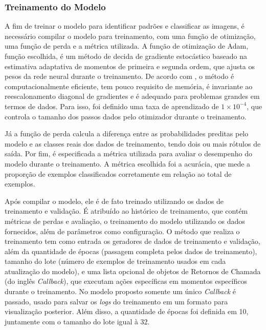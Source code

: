 
\subsubsection{\esp Treinamento do Modelo} \label{treinamento}

A fim de treinar o modelo para identificar padrões e classificar as imagens, é necessário compilar o modelo para treinamento, com uma função de otimização, uma função de perda e a métrica utilizada. A função de otimização de Adam, função escolhida, é um método de decida de gradiente estocástico baseado na estimativa adaptativa de momentos de primeira e segunda ordem, que ajusta os pesos da rede neural durante o treinamento. De acordo com , o método é computacionalmente eficiente, tem pouco requisito de memória, é invariante ao reescalonamento diagonal de gradientes e é adequado para problemas grandes em termos de dados. Para isso, foi definido uma taxa de aprendizado de \ensuremath{1 \times 10^{-4}}, que controla o tamanho dos passos dados pelo otimizador durante o treinamento. 

Já a função de perda calcula a diferença entre as probabilidades preditas pelo modelo e as classes reais dos dados de treinamento, tendo dois ou mais rótulos de saída. Por fim, é especificada a métrica utilizada para avaliar o desempenho do modelo durante o treinamento. A métrica escolhida foi a acurácia, que mede a proporção de exemplos classificados corretamente em relação ao total de exemplos. 

Após compilar o modelo, ele é de fato treinado utilizando os dados de treinamento e validação. É atribuído ao histórico de treinamento, que contém métricas de perdas e avaliação, o treinamento do modelo utilizando os dados fornecidos, além de parâmetros como configuração. O método que realiza o treinamento tem como entrada os geradores de dados de treinamento e validação, além da quantidade de épocas (passagem completa pelos dados de treinamento), tamanho do lote (número de exemplos de treinamento usados em cada atualização do modelo), e uma lista opcional de objetos de Retornos de Chamada (do inglês \textit{Callback}), que executam ações específicas em momentos específicos durante o treinamento. No modelo proposto somente um único \textit{Callback} é passado, usado para salvar os \textit{logs} do treinamento em um formato para visualização posterior. Além disso, a quantidade de épocas foi definida em 10, juntamente com o tamanho do lote igual à 32.


